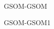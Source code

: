 \setcounter{curtask}{1}

\begin{task}
    GSOM-GSOM
\end{task}

\begin{task}
    GSOM-GSOM1
\end{task}
